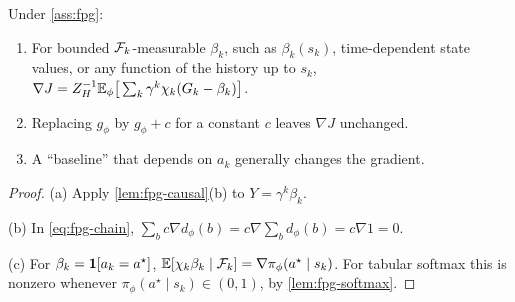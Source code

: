 \begin{proposition}[baselines]\label{prop:fpg-baseline}
Under \cref{ass:fpg}:
\begin{enumerate}[nosep,label=(\alph*)]
\item For bounded $\mathcal{F}_k$-measurable $\beta_k$, such as $\beta_k(s_k)$, time-dependent state values, or any function of the history up to $s_k$,
  $\nabla J=Z_H^{-1}\mathbb{E}_\phi\big[\sum_k\gamma^k\chi_k(G_k-\beta_k)\big]$.
\item Replacing $g_\phi$ by $g_\phi+c$ for a constant $c$ leaves $\nabla J$ unchanged.
\item A ``baseline'' that depends on $a_k$ generally changes the gradient.
\end{enumerate}
\end{proposition}
\begin{proof}
(a) Apply \cref{lem:fpg-causal}(b) to $Y=\gamma^k\beta_k$.

(b) In \eqref{eq:fpg-chain}, $\sum_bc\nabla d_\phi(b)=c\nabla\sum_bd_\phi(b)=c\nabla1=0$.

(c) For $\beta_k=\mathbf{1}[a_k=a^\star]$, $\mathbb{E}[\chi_k\beta_k\mid\mathcal{F}_k]=\nabla\pi_\phi(a^\star\mid s_k)$. For tabular softmax this is nonzero whenever $\pi_\phi(a^\star\mid s_k)\in(0,1)$, by \cref{lem:fpg-softmax}.
\end{proof}

